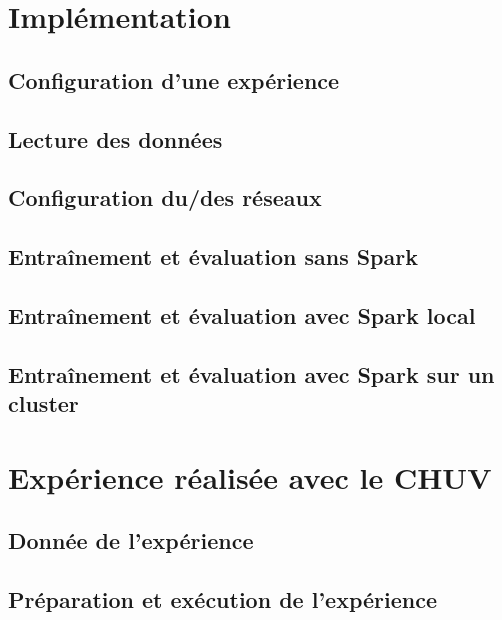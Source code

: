 \documentclass[a4paper,10pt,openany,oneside]{sphinxmanual}
\begin{document}
\chapter{Implémentation}
\label{index:implementation}

\section{Configuration d'une expérience}
\label{index:configuration-d-une-experience}

\section{Lecture des données}
\label{index:lecture-des-donnees}

\section{Configuration du/des réseaux}
\label{index:configuration-du-des-reseaux}

\section{Entraînement et évaluation sans Spark}
\label{index:entrainement-et-evaluation-sans-spark}

\section{Entraînement et évaluation avec Spark local}
\label{index:entrainement-et-evaluation-avec-spark-local}

\section{Entraînement et évaluation avec Spark sur un cluster}
\label{index:entrainement-et-evaluation-avec-spark-sur-un-cluster}

\chapter{Expérience réalisée avec le CHUV}
\label{index:experience-realisee-avec-le-chuv}

\section{Donnée de l'expérience}
\label{index:donnee-de-l-experience}

\section{Préparation et exécution de l'expérience}
\label{index:preparation-et-execution-de-l-experience}
\end{document}
